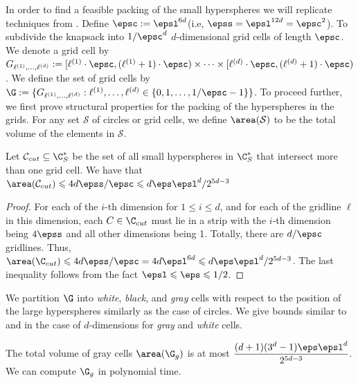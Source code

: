 	In order to find a feasible packing of the small hyperspheres we will replicate techniques from .  Define \(\epsc:=\epsl^{6d}\)(i.e, \(\epss=\epsl^{12d}=\epsc^2\)). To subdivide the knapsack into \(1/\epsc^d\) $d$-dimensional grid cells of length \(\epsc\). We denote a grid cell by \(G_{\ell^{(1)},\dots,\ell^{(d)}}:=[\ell^{(1)}\cdot\epsc,(\ell^{(1)}+1)\cdot\epsc)\times\dots\times[\ell^{(d)}\cdot\epsc,(\ell^{(d)}+1)\cdot\epsc)\). We define the set of grid cells by \(\G:=\{G_{\ell^{(1)},\dots,\ell^{(d)}}:\ell^{(1)},\dots,\ell^{(d)}\in\{0,1,\dots,1/\epsc-1\}\}\). To proceed further, we first prove structural properties for the packing of the hyperspheres in the grids. For any set \(\mathcal{S}\) of circles or grid cells, we define \(\area(\mathcal{S})\) to be the total volume of the elements in \(\mathcal{S}\).
	\begin{lem}\label{lem:small-hypersphere-grid-cells}
		Let \(\mathcal{C}_{cut}\subseteq\C_{S}^{*}\) be the set of all small hyperspheres in \(\C_{S}^{*}\) that intersect more than one grid cell. We have that \(\area(\mathcal{C}_{cut})\leqslant4d\epss/\epsc\leqslant d\eps\epsl^d/2^{5d-3}\)
	\end{lem}
	\begin{proof}
		For each of the \(i\)-th dimension for \(1\leqslant i \leqslant d\), and for each of the gridline \(\ell\) in this dimension, each \(C\in\C_{cut}\) must lie in a strip with the \(i\)-th dimension being \(4\epss\) and all other dimensions being 1. Totally, there are \(d/\epsc\) gridlines. Thus, \(\area(\C_{cut})\leqslant4d\epss/\epsc=4d\epsl^{6d}\leqslant d\eps\epsl^d/2^{5d-3}\). The last inequality follows from the fact \(\epsl\leqslant \eps\leqslant 1/2\).
	\end{proof}
	We partition \(\G\) into \emph{white}, \emph{black}, and \emph{gray} cells with respect to the position of the large hyperspheres similarly as the case of circles. We give bounds similar to  and  in the case of $d$-dimensions for \emph{gray} and \emph{white} cells.
	\begin{lem}\label{lem:gray-circles-d}
		The total volume of gray cells \(\area(\G_{g})\) is at most \(\dfrac{(d+1)(3^d-1)\eps\epsl^d}{2^{5d-3}}\). We can compute \(\G_g\) in polynomial time.
	\end{lem}

